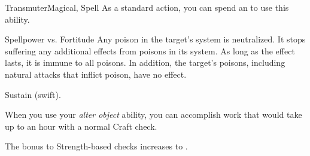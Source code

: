 \begin{feat}{Transmuter}{Magical, Spell}
         As a standard action, you can spend an  to use this ability.
        \begin{ability}
            \begin{spelltargetinginfo}
            \end{spelltargetinginfo}
            \begin{spelleffects}
                \begin{spellattack}{Spellpower vs. Fortitude}
                    \spellsuccess Any poison in the target's system is neutralized.
                    It stops suffering any additional effects from poisons in its system.
                    As long as the effect lasts, it is immune to all poisons.
                    In addition, the target's  poisons, including natural attacks that inflict poison, have no effect.
                \end{spellattack}
                \spelldur Sustain (swift).
            \end{spelleffects}
        \end{ability}

         When you use your \textit{alter object} ability, you can accomplish work that would take up to an hour with a normal Craft check.

         The bonus to Strength-based checks increases to .
    \end{feat}

